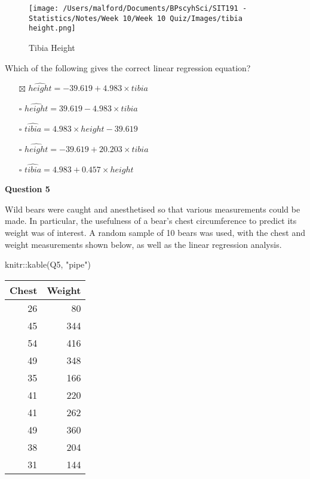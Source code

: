 \documentclass[
]{article}
\newenvironment{Shaded}{\begin{snugshade}}{\end{snugshade}}
\newcommand{\FunctionTok}[1]{\textcolor[rgb]{0.00,0.00,0.00}{#1}}
\newcommand{\NormalTok}[1]{#1}
\newcommand{\SpecialCharTok}[1]{\textcolor[rgb]{0.00,0.00,0.00}{#1}}
\newcommand{\StringTok}[1]{\textcolor[rgb]{0.31,0.60,0.02}{#1}}
\providecommand{\tightlist}{%
  \setlength{\itemsep}{0pt}\setlength{\parskip}{0pt}}
\begin{document}
\begin{figure}
\centering
\texttt{[image: /Users/malford/Documents/BPscyhSci/SIT191 - Statistics/Notes/Week 10/Week 10 Quiz/Images/tibia height.png]}
\caption{Tibia Height}
\end{figure}

Which of the following gives the correct linear regression equation?

\begin{itemize}
\tightlist
\item[$\boxtimes$]
  \(\hat{height} = −39.619 + 4.983 \times tibia\)
\item[$\square$]
  \(\hat{height} = 39.619−4.983 \times tibia\)
\item[$\square$]
  \(\hat{tibia} = 4.983 \times height − 39.619\)
\item[$\square$]
  \(\hat{height} = −39.619 + 20.203 \times tibia\)
\item[$\square$]
  \(\hat{tibia} = 4.983 + 0.457 \times height\)
\end{itemize}

\textbf{Question 5}

Wild bears were caught and anesthetised so that various measurements
could be made. In particular, the usefulness of a bear's chest
circumference to predict its weight was of interest. A random sample of
10 bears was used, with the chest and weight measurements shown below,
as well as the linear regression analysis.

\begin{Shaded}
\begin{Highlighting}[]
\NormalTok{knitr}\SpecialCharTok{::}\FunctionTok{kable}\NormalTok{(Q5, }\StringTok{"pipe"}\NormalTok{)}
\end{Highlighting}
\end{Shaded}

\begin{longtable}[]{@{}rr@{}}
\toprule
Chest & Weight \\
\midrule
\endhead
26 & 80 \\
45 & 344 \\
54 & 416 \\
49 & 348 \\
35 & 166 \\
41 & 220 \\
41 & 262 \\
49 & 360 \\
38 & 204 \\
31 & 144 \\
\bottomrule
\end{longtable}
\end{document}
